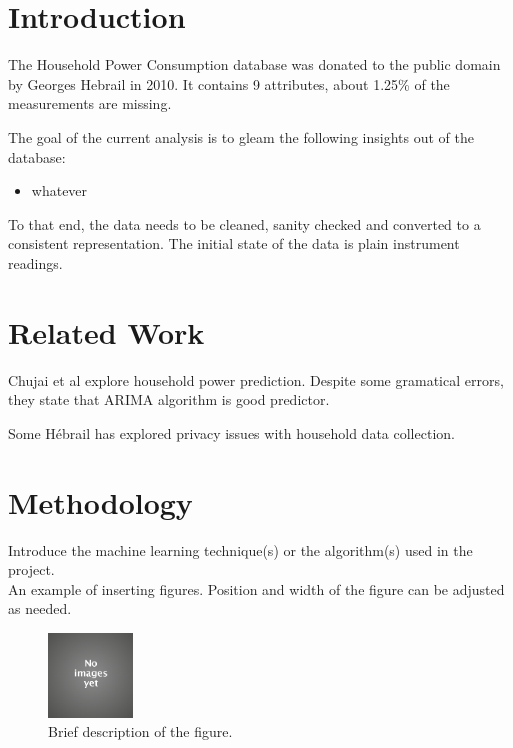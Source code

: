 \documentclass[11pt]{article}
\title{\MakeMeBlue{title?}}
\author{Miroslav Vitkov}
\date{\today}
\newcommand{\para}[0]{\par\vspace{0.5cm}}
\begin{document}
\maketitle

\section{Introduction}
The Household Power Consumption database was donated to the public domain by Georges Hebrail in 2010.
It contains 9 attributes, about 1.25\% of the measurements are missing.
\para
The goal of the current analysis is to gleam the following insights out of the database:
\begin{itemize}
    \item{whatever}
\end{itemize}
\para
To that end, the data needs to be cleaned, sanity checked and converted to a consistent representation.
The initial state of the data is plain instrument readings.

\section{Related Work}
Chujai et al\cite{q1} explore household power prediction.
Despite some gramatical errors, they state that ARIMA algorithm is good predictor.
\para 
Some Hébrail has explored privacy issues with household data collection\cite{q2}.
\section{Methodology}
Introduce the machine learning technique(s) or the algorithm(s) used in the project. \\

An example of inserting figures. Position and width of the figure can be adjusted as needed.
\begin{figure}[!htp]        
  \centering
    \includegraphics[width=0.2\textwidth]{MyProject-KnowledgeDiscovery/image.jpg}
    \caption{Brief description of the figure.}
\end{figure}
\end{document}
